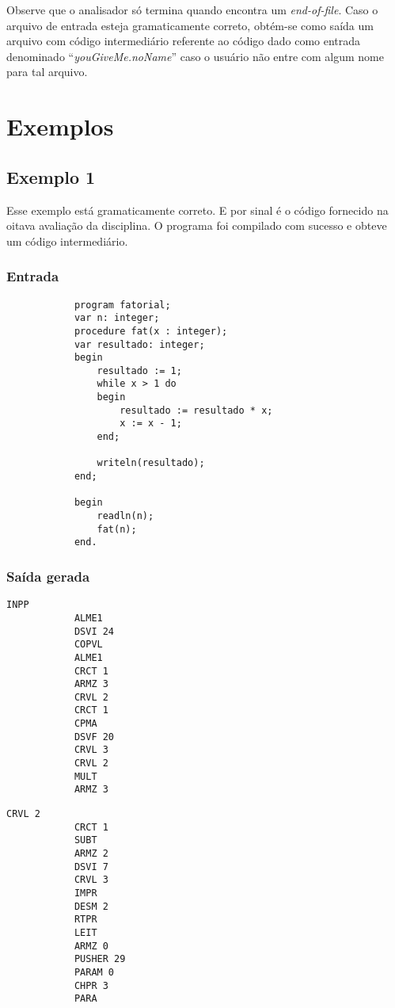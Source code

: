 \documentclass{article}
\begin{document}
	Observe que o analisador só termina quando encontra um \emph{end-of-file}. Caso o arquivo de entrada esteja gramaticamente correto, obtém-se como saída um arquivo com código intermediário referente ao código dado como entrada denominado ``\emph{youGiveMe.noName}'' caso o usuário não entre com algum nome para tal arquivo.

\section{Exemplos} %
\label{sec:exemplos}
	
	\subsection{Exemplo 1} %
	\label{sub:exemplo_1}
		Esse exemplo está gramaticamente correto. E por sinal é o código fornecido na oitava avaliação da disciplina. 
		O programa foi compilado com sucesso e obteve um código intermediário.

		\subsubsection*{Entrada} %
		\label{ssub:entrada}
		
		\begin{lstlisting}
			program fatorial;
			var n: integer;
			procedure fat(x : integer);
			var resultado: integer;
			begin
				resultado := 1;
				while x > 1 do
				begin
					resultado := resultado * x;
					x := x - 1;
				end;

				writeln(resultado);
			end;

			begin
				readln(n);
				fat(n);
			end.
		\end{lstlisting}


		\subsubsection*{Saída gerada} %
		\label{ssub:sa_da_gerada}
			\begin{center}
			\begin{minipage}[t]{0.4\textwidth}
			\begin{lstlisting}[firstnumber=0]
			INPP
			ALME1
			DSVI 24
			COPVL
			ALME1
			CRCT 1
			ARMZ 3
			CRVL 2
			CRCT 1
			CPMA
			DSVF 20
			CRVL 3
			CRVL 2
			MULT
			ARMZ 3
			\end{lstlisting}
			\end{minipage}
			\begin{minipage}[t]{0.4\textwidth}
			\begin{lstlisting}[firstnumber=15]
			CRVL 2
			CRCT 1
			SUBT
			ARMZ 2
			DSVI 7
			CRVL 3
			IMPR
			DESM 2
			RTPR
			LEIT
			ARMZ 0
			PUSHER 29
			PARAM 0
			CHPR 3
			PARA
			\end{lstlisting}
			\end{minipage}
			\end{center}
\end{document}
